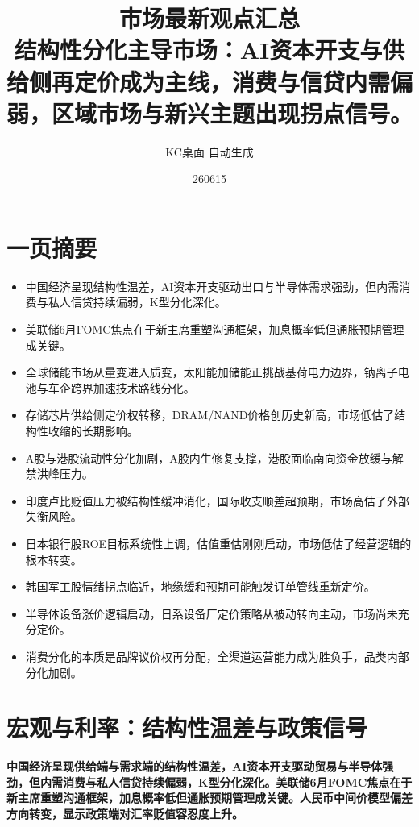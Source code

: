 \documentclass[11pt]{ctexart}
\title{\textbf{市场最新观点汇总}\\[0.4em]{\large 结构性分化主导市场：AI资本开支与供给侧再定价成为主线，消费与信贷内需偏弱，区域市场与新兴主题出现拐点信号。}}
\author{KC桌面 自动生成}
\date{260615}
\begin{document}
\maketitle
\tableofcontents
\newpage
\section{一页摘要}
\begin{itemize}
  \item 中国经济呈现结构性温差，AI资本开支驱动出口与半导体需求强劲，但内需消费与私人信贷持续偏弱，K型分化深化。
  \item 美联储6月FOMC焦点在于新主席重塑沟通框架，加息概率低但通胀预期管理成关键。
  \item 全球储能市场从量变进入质变，太阳能加储能正挑战基荷电力边界，钠离子电池与车企跨界加速技术路线分化。
  \item 存储芯片供给侧定价权转移，DRAM/NAND价格创历史新高，市场低估了结构性收缩的长期影响。
  \item A股与港股流动性分化加剧，A股内生修复支撑，港股面临南向资金放缓与解禁洪峰压力。
  \item 印度卢比贬值压力被结构性缓冲消化，国际收支顺差超预期，市场高估了外部失衡风险。
  \item 日本银行股ROE目标系统性上调，估值重估刚刚启动，市场低估了经营逻辑的根本转变。
  \item 韩国军工股情绪拐点临近，地缘缓和预期可能触发订单管线重新定价。
  \item 半导体设备涨价逻辑启动，日系设备厂定价策略从被动转向主动，市场尚未充分定价。
  \item 消费分化的本质是品牌议价权再分配，全渠道运营能力成为胜负手，品类内部分化加剧。
\end{itemize}
\section{宏观与利率：结构性温差与政策信号}
\textbf{中国经济呈现供给端与需求端的结构性温差，AI资本开支驱动贸易与半导体强劲，但内需消费与私人信贷持续偏弱，K型分化深化。美联储6月FOMC焦点在于新主席重塑沟通框架，加息概率低但通胀预期管理成关键。人民币中间价模型偏差方向转变，显示政策端对汇率贬值容忍度上升。}
\end{document}
